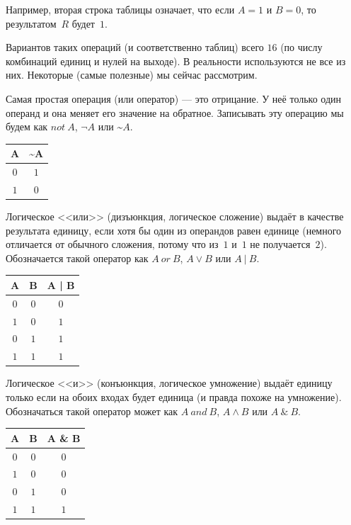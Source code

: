Например, вторая строка таблицы означает, что если $A=1$ и $B=0$, то результатом~$R$ будет~$1$.

Вариантов таких операций (и соответственно таблиц) всего $16$ (по числу комбинаций единиц и нулей на выходе).
В реальности используются не все из них. Некоторые (самые полезные) мы сейчас рассмотрим.

Самая простая операция (или оператор) --- это отрицание. У неё только один операнд и она
меняет его значение на обратное. Записывать эту операцию мы будем как $not\ A$,
$\neg A$ или $\mbox{\textasciitilde}A$.

\begin{center}
\begin{tabular}{|c|c|}
 \hline
 \textbf{A} & \textbf{\textasciitilde A} \\ \hline
 $0$ & $1$ \\ \hline
 $1$ & $0$ \\ \hline
\end{tabular}
\end{center}

Логическое <<или>> (дизъюнкция, логическое сложение) выдаёт в качестве результата единицу,
если хотя бы один из операндов равен единице (немного отличается от обычного сложения,
потому что из~$1$ и~$1$ не получается~$2$). Обозначается такой оператор как $A\ or\ B$, $A \vee B$
или $A\ |\ B$.

\begin{center}
\begin{tabular}{|c|c|c|}
 \hline
 \textbf{A} & \textbf{B} & \textbf{A | B} \\ \hline
 $0$ & $0$ & $0$ \\ \hline
 $1$ & $0$ & $1$ \\ \hline
 $0$ & $1$ & $1$ \\ \hline
 $1$ & $1$ & $1$ \\ \hline
\end{tabular}
\end{center}

Логическое <<и>> (конъюнкция, логическое умножение) выдаёт единицу только если на обоих
входах будет единица (и правда похоже на умножение). Обозначаться такой
оператор может как $A\ and\ B$, $A \wedge B$ или $A\ \mbox{\&}\ B$.

\begin{center}
\begin{tabular}{|c|c|c|}
 \hline
 \textbf{A} & \textbf{B} & \textbf{A \& B} \\ \hline
 $0$ & $0$ & $0$ \\ \hline
 $1$ & $0$ & $0$ \\ \hline
 $0$ & $1$ & $0$ \\ \hline
 $1$ & $1$ & $1$ \\ \hline
\end{tabular}
\end{center}

